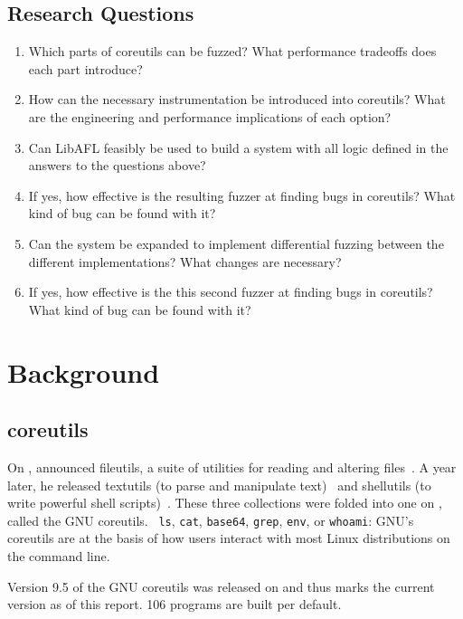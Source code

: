 \documentclass{article}
\newcommand{\code}[1]{\texttt{#1}}
\let\savedCite=\cite
\renewcommand{\cite}{\unskip~\savedCite}
\begin{document}
\begin{multicols}{2}
    \subsection{Research Questions}
    \begin{enumerate}
        \item Which parts of coreutils can be fuzzed? What performance tradeoffs does each part introduce?
        \item How can the necessary instrumentation be introduced into coreutils? What are the engineering and performance implications of each option?
        \item Can LibAFL feasibly be used to build a system with all logic defined in the answers to the questions above?
        \item If yes, how effective is the resulting fuzzer at finding bugs in coreutils? What kind of bug can be found with it?
        \item Can the system be expanded to implement differential fuzzing between the different implementations? What changes are necessary?
        \item If yes, how effective is the this second fuzzer at finding bugs in coreutils? What kind of bug can be found with it?
    \end{enumerate}

    \section{Background}
    \subsection{coreutils}
    On , \citeauthor{FileUtilsAnnouncement} announced fileutils, a suite of utilities for reading and altering files\cite{FileUtilsAnnouncement}. A year later, he released textutils (to parse and manipulate text)\cite{TextUtilsAnnouncement} and shellutils (to write powerful shell scripts)\cite{ShellUtilsAnnouncement}. These three collections were folded into one on , called the GNU coreutils.\cite{CoreUtilsAnnouncement} \code{ls}, \code{cat}, \code{base64}, \code{grep}, \code{env}, or \code{whoami}: GNU's coreutils are at the basis of how users interact with most Linux distributions on the command line.\cite{GNULinux}

    Version 9.5 of the GNU coreutils was released on  and thus marks the current version as of this report. 106 programs are built per default.\cite{GNUCoreUtils9.5}


\end{multicols}
\end{document}
